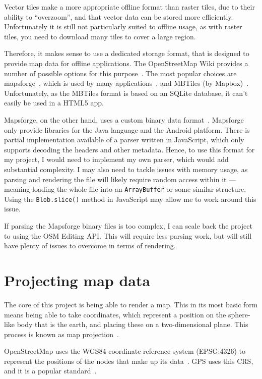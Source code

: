 \documentclass[]{final_report}
\begin{document}
Vector tiles make a more appropriate offline format than raster tiles, due to their ability to ``overzoom'', and that vector data can be stored more efficiently. Unfortunately it is still not particularly suited to offline usage, as with raster tiles, you need to download many tiles to cover a large region.

Therefore, it makes sense to use a dedicated storage format, that is designed to provide map data for offline applications. The OpenStreetMap Wiki provides a number of possible options for this purpose~\cite{osm-wiki-offline}. The most popular choices are mapsforge~\cite{mapsforge}, which is used by many applications~\cite{apps-using-mapsforge}, and MBTiles (by Mapbox)~\cite{mapbox-mbtiles}. Unfortunately, as the MBTiles format is based on an SQLite database, it can't easily be used in a HTML5 app.

Mapsforge, on the other hand, uses a custom binary data format~\cite{mapsforge-format}. Mapsforge only provide libraries for the Java language and the Android platform. There is partial implementation available of a parser written in JavaScript, which only supports decoding the headers and other metadata. Hence, to use this format for my project, I would need to implement my own parser, which would add substantial complexity. I may also need to tackle issues with memory usage, as parsing and rendering the file will likely require random access within it --- meaning loading the whole file into an \texttt{ArrayBuffer} or some similar structure. Using the \texttt{Blob.slice()} method in JavaScript may allow me to work around this issue.

If parsing the Mapsforge binary files is too complex, I can scale back the project to using the OSM Editing API\@. This will require less parsing work, but will still have plenty of issues to overcome in terms of rendering.

\chapter{Projecting map data}

The core of this project is being able to render a map. This in its most basic form means being able to take coordinates, which represent a position on the sphere-like body that is the earth, and placing these on a two-dimensional plane. This process is known as map projection~\cite[5]{canters2002small}.

OpenStreetMap uses the WGS84 coordinate reference system (EPSG:4326) to represent the positions of the nodes that make up its data~\cite{osm-wiki-wgs84}. GPS uses this CRS, and it is a popular standard~\cite{epsg.io-epsg:4326}.
\end{document}
